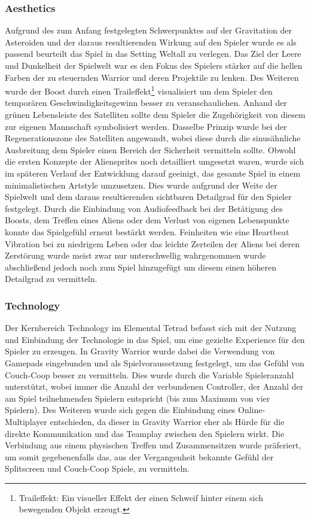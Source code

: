 \documentclass[11pt]{scrartcl}
\begin{document}
\subsubsection{Aesthetics}
Aufgrund des zum Anfang festgelegten Schwerpunktes auf der Gravitation der Asteroiden und der daraus resultierenden Wirkung auf den Spieler wurde es als passend beurteilt das Spiel in das Setting Weltall zu verlegen. Das Ziel der Leere und Dunkelheit der Spielwelt war es den Fokus des Spielers stärker auf die hellen Farben der zu steuernden Warrior und deren Projektile zu lenken. Des Weiteren wurde der Boost durch einen Traileffekt\footnote{Traileffekt: Ein visueller Effekt der einen Schweif hinter einem sich bewegenden Objekt erzeugt.} visualisiert um dem Spieler den temporären Geschwindigkeitsgewinn besser zu veranschaulichen. Anhand der grünen Lebensleiste des Satelliten sollte dem Spieler die Zugehörigkeit von diesem zur eigenen Mannschaft symbolisiert werden. Dasselbe Prinzip wurde bei der Regenerationszone des Satelliten angewandt, wobei diese durch die sinusähnliche Ausbreitung dem Spieler einen Bereich der Sicherheit vermitteln sollte. 
Obwohl die ersten Konzepte der Aliensprites noch detailliert umgesetzt waren, wurde sich im späteren Verlauf der Entwicklung darauf geeinigt, das gesamte Spiel in einem minimalistischen Artstyle umzusetzen. Dies wurde aufgrund der Weite der Spielwelt und dem daraus resultierenden sichtbaren Detailgrad für den Spieler festgelegt.
Durch die Einbindung von Audiofeedback bei der Betätigung des Boosts, dem Treffen eines Aliens oder dem Verlust von eigenen Lebenspunkte konnte das Spielgefühl erneut bestärkt werden. Feinheiten wie eine Heartbeat Vibration bei zu niedrigem Leben oder das leichte Zerteilen der Aliens bei deren Zerstörung wurde meist zwar nur unterschwellig wahrgenommen wurde abschließend jedoch noch zum Spiel hinzugefügt um diesem einen höheren Detailgrad zu vermitteln.

\subsubsection{Technology}
\label{subsec:tech}
Der Kernbereich Technology im Elemental Tetrad befasst sich mit der Nutzung und Einbindung der Technologie in das Spiel, um eine gezielte Experience für den Spieler zu erzeugen\cite[~p.412]{S2014}. In Gravity Warrior wurde dabei die Verwendung von Gamepads eingebunden und als Spielvoraussetzung festgelegt, um das Gefühl von Couch-Coop besser zu vermitteln. Dies wurde durch die Variable Spieleranzahl unterstützt, wobei immer die Anzahl der verbundenen Controller, der Anzahl der am Spiel teilnehmenden Spielern entspricht (bis zum Maximum von vier Spielern). Des Weiteren wurde sich gegen die Einbindung eines Online-Multiplayer entschieden, da dieser in Gravity Warrior eher als Hürde für die direkte Kommunikation und das Teamplay zwischen den Spielern wirkt. Die Verbindung aus einem physischen Treffen und Zusammensitzen wurde präferiert, um somit gegebenenfalls das, aus der Vergangenheit bekannte Gefühl der Splitscreen und Couch-Coop Spiele, zu vermitteln.
\end{document}
